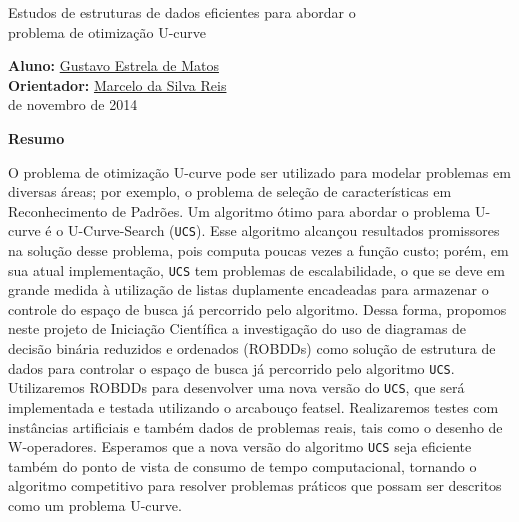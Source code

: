 \documentclass[12pt]{article}
\begin{document}
%
\doublespacing


\begin{center}

  {\LARGE Estudos de estruturas de dados eficientes para abordar o\\
    \bigskip
    problema de otimização U-curve}

  \bigskip
        
  {\large {\bf Aluno:} \href{mailto:gustavo.estrela.matos@usp.br}{Gustavo Estrela de Matos}\\ 
  {\bf Orientador:} \href{mailto:marcelo.reis@butantan.gov.br}{Marcelo da Silva Reis}\\
   de novembro de 2014\\
  }

  \bigskip
  \bigskip

  {\bf Resumo}

\end{center}
O problema de otimização U-curve pode ser utilizado para modelar problemas em diversas áreas; por exemplo, o problema de seleção de características em Reconhecimento de Padrões. Um algoritmo ótimo para abordar o problema U-curve é o U-Curve-Search ({\tt UCS}). Esse algoritmo alcançou resultados promissores na solução desse problema, pois computa poucas vezes a função custo; porém, em sua atual implementação, {\tt UCS} tem problemas de escalabilidade, o que se deve em grande medida à utilização de listas duplamente encadeadas para armazenar o controle do espaço de busca já percorrido pelo algoritmo. Dessa forma, propomos neste projeto de Iniciação Científica a investigação do uso de diagramas de decisão binária reduzidos e ordenados (ROBDDs) como solução de estrutura de dados para controlar o espaço de busca já percorrido pelo algoritmo {\tt UCS}. Utilizaremos ROBDDs para desenvolver uma nova versão do {\tt UCS}, que será implementada e testada utilizando o arcabouço featsel. Realizaremos testes com instâncias artificiais e também dados de problemas reais, tais como o desenho de W-operadores. Esperamos que a nova versão do algoritmo {\tt UCS} seja eficiente também do ponto de vista de consumo de tempo computacional, tornando o algoritmo competitivo para resolver problemas práticos que possam ser descritos como um problema U-curve.

\newpage
\end{document}
